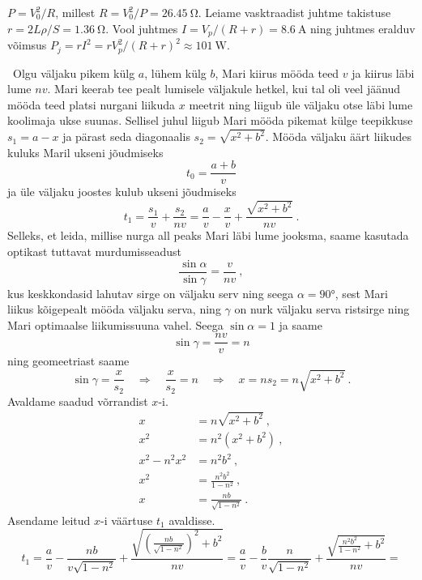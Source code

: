 \documentclass[10pt]{article}
\begin{document}

\solu
$P=V_0^2/R$, millest $R=V_0^2/P=\qty{26.45}{\ohm}$. Leiame vasktraadist juhtme takistuse $r=2L\rho/S=\qty{1.36}{\ohm}$. Vool juhtmes $I=V_p/(R+r)=\qty{8.6}{\A}$ ning juhtmes eralduv võimsus $P_j=rI^2=rV_p^2/(R+r)^2\approx\qty{101}{\W}$.
\probend
\bigskip


\solu
\
Olgu väljaku pikem külg \(a\), lühem külg \(b\), Mari kiirus mööda teed \(v\) ja kiirus läbi lume \(nv\). Mari keerab tee pealt lumisele väljakule hetkel, kui tal oli veel jäänud mööda teed platsi nurgani liikuda \(x\) meetrit ning liigub üle väljaku otse läbi lume koolimaja ukse suunas. Sellisel juhul liigub Mari mööda pikemat külge teepikkuse \(s_1 = a - x\) ja pärast seda diagonaalis \(s_2 = \sqrt{x^2 + b^2}\). Mööda väljaku äärt liikudes kuluks Maril ukseni jõudmiseks
\[
    t_0 = \frac{a + b}{v}
\]
ja üle väljaku joostes kulub ukseni jõudmiseks
\[
    t_1 = \frac{s_1}{v} + \frac{s_2}{nv} = \frac{a}{v} - \frac{x}{v} + \frac{\sqrt{x^2 + b^2}}{nv} \ .
\]
Selleks, et leida, millise nurga all peaks Mari läbi lume jooksma, saame kasutada optikast tuttavat murdumisseadust
\[
    \frac{\sin \alpha}{\sin \gamma} = \frac{v}{nv} \ ,
\]
kus keskkondasid lahutav sirge on väljaku serv ning seega \(\alpha = \ang{90}\), sest Mari liikus kõigepealt mööda väljaku serva, ning \(\gamma\) on nurk väljaku serva ristsirge ning Mari optimaalse liikumissuuna vahel. Seega \(\sin \alpha = 1\) ja saame
\[
    \sin \gamma = \frac{nv}{v} = n
\]
ning geomeetriast saame
\[
    \sin \gamma = \frac{x}{s_2} \quad \Rightarrow \quad \frac{x}{s_2} = n \quad \Rightarrow \quad x = n s_2 = n \sqrt{x^2 + b^2} \ .
\]
Avaldame saadud võrrandist \(x\)-i.
\begin{align*}
    x &= n \sqrt{x^2 + b^2} \ , \\
    x^2 &= n^2 (x^2 + b^2) \ , \\
    x^2 - n^2 x^2 &= n^2 b^2 \ , \\
    x^2 &= \frac{n^2 b^2}{1 - n^2} \ , \\
    x &= \frac{n b}{\sqrt{1 - n^2}} \ .
\end{align*}
Asendame leitud \(x\)-i väärtuse \(t_1\) avaldisse.
\[
    t_1 = \frac{a}{v} - \frac{n b}{v\sqrt{1 - n^2}} + \frac{\sqrt{\left(\frac{n b}{\sqrt{1 - n^2}}\right)^2 + b^2}}{n v} = \frac{a}{v} - \frac{b}{v} \frac{n}{\sqrt{1-n^2}} + \frac{\sqrt{\frac{n^2 b^2}{1 - n^2} + b^2}}{n v} = 
\]
\end{document}
